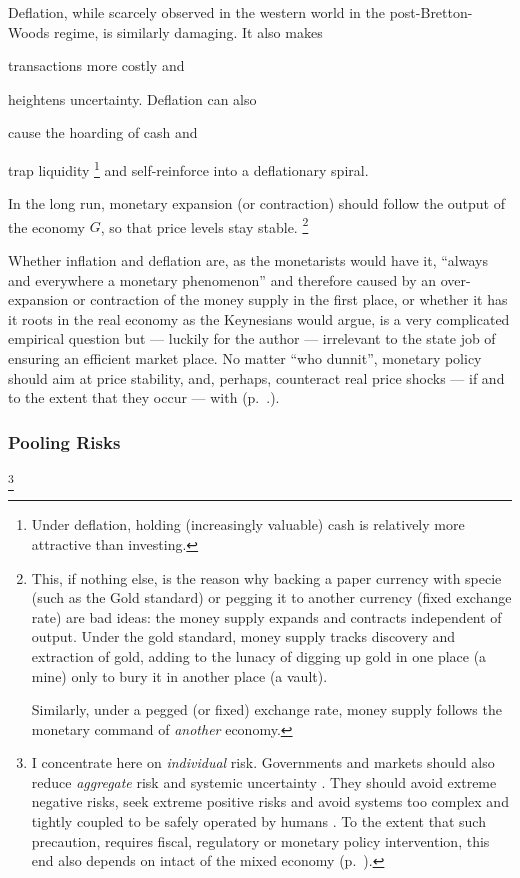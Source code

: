 Deflation, while scarcely observed in the western world in the post-Bretton-Woods regime, is similarly damaging.
It also makes \begin{inparaenum}[\itshape 1\upshape)]
	\item transactions more costly and
	\item heightens uncertainty. Deflation can also
	\item cause the hoarding of cash and
	\item trap liquidity
	\footnote{
		Under deflation, holding (increasingly valuable) cash is relatively more attractive than investing.
	}
	and self-reinforce into a deflationary spiral.
	\end{inparaenum}

In the long run, monetary expansion (or contraction) should follow the output of the economy $G$, so that price levels stay stable.
\footnote{
	This, if nothing else, is the reason why backing a paper currency with specie (such as the Gold standard) or pegging it to another currency (fixed exchange rate) are bad ideas:
	the money supply expands and contracts independent of output.
	Under the gold standard, money supply tracks discovery and extraction of gold, adding to the lunacy of digging up gold in one place (a mine) only to bury it in another place (a vault).

	Similarly, under a pegged (or fixed) exchange rate, money supply follows the monetary command of \emph{another} economy.
}

Whether inflation and deflation are, as the monetarists would have it, ``always and everywhere a monetary phenomenon'' \citep{Friedman1970} %
and therefore caused by an over-expansion or contraction of the money supply in the first place, or whether it has it roots in the real economy as the Keynesians would argue, is a very complicated empirical question but --- luckily for the author --- irrelevant to the state job of ensuring an efficient market place.
No matter ``who dunnit'', monetary policy should aim at price stability, and, perhaps, counteract real price shocks --- if and to the extent that they occur --- with  (p.~\pageref{sec:monetary-stimulus}.).

\subsubsection[Pooling Risks]{Pooling Risks} \label{sec:risk}
\footnote{
	I concentrate here on \emph{individual} risk.
	Governments and markets should also reduce \emph{aggregate} risk and systemic uncertainty \citep{Knight1921}.
	They should avoid extreme negative risks, seek extreme positive risks \citep{Taleb2007} and avoid systems too complex and tightly coupled to be safely operated by humans \citep{Perrow-1999-aa}.
	To the extent that such precaution, requires fiscal, regulatory or monetary policy intervention, this end also depends on intact  of the mixed economy (p.~\pageref{sec:means}).
}

